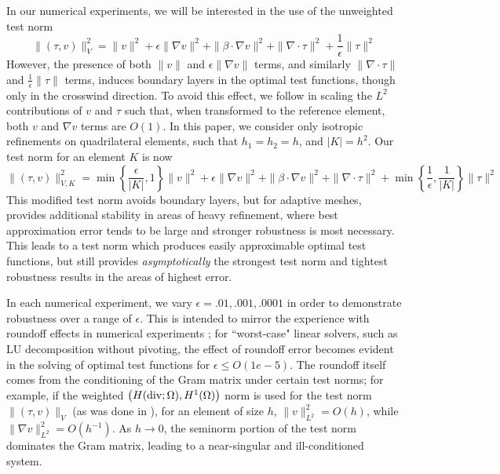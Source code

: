 \documentclass[11pt,onecolumn]{scrartcl}
\newcommand{\grad}{\nabla}
\renewcommand{\div}{\grad \cdot}
\begin{document}
In our numerical experiments, we will be interested in the use of the unweighted test norm 
\[
\|\left(\tau, v\right)\|_{V}^2 = \|v\|^2 + \epsilon \|\grad v\|^2 + \|\beta \cdot \grad v\|^2 + \| \div \tau\|^2 + \frac{1}{\epsilon}\|\tau\|^2
\]
However, the presence of both $\|v\|$ and $\epsilon\|\grad v\|$ terms, and similarly $\|\div \tau\|$ and $\frac{1}{\epsilon}\|\tau\|$ terms, induces boundary layers in the optimal test functions, though only in the crosswind direction.  To avoid this effect, we follow \cite{DPGrobustness} in scaling the $L^2$ contributions of $v$ and $\tau$ such that, when transformed to the reference element, both $v$ and $\grad v$ terms are $O(1)$.  In this paper, we consider only isotropic refinements on quadrilateral elements, such that $h_1 = h_2 = h$, and $|K| = h^2$. Our test norm for an element $K$ is now
\[
\|\left(\tau, v\right)\|_{V,K}^2 = \min\left\{\frac{\epsilon}{|K|},1\right\}\|v\|^2 + \epsilon \|\grad v\|^2 + \|\beta \cdot \grad v\|^2 + \| \div \tau\|^2 + \min\left\{\frac{1}{\epsilon},\frac{1}{|K|}\right\}\|\tau\|^2
\]
This modified test norm avoids boundary layers, but for adaptive meshes, provides additional stability in areas of heavy refinement, where best approximation error tends to be large and stronger robustness is most necessary.  This leads to a test norm which produces easily approximable optimal test functions, but still provides \textit{asymptotically} the strongest test norm and tightest robustness results in the areas of highest error.  



In each numerical experiment, we vary $\epsilon = .01, .001, .0001$ in order to demonstrate robustness over a range of $\epsilon$.  This is intended to mirror the experience with roundoff effects in numerical experiments \cite{DPGrobustness}; for ``worst-case" linear solvers, such as LU decomposition without pivoting, the effect of roundoff error becomes evident in the solving of optimal test functions for $\epsilon \leq O(1e-5)$.  The roundoff itself comes from the conditioning of the Gram matrix under certain test norms; for example, if the weighted $\left(H({\rm div};\Omega), H^1(\Omega)\right)$ norm is used for the test norm $\|\left(\tau,v\right)\|_V$ (as was done in \cite{DPG2}), for an element of size $h$, $\|v\|_{L^2}^2 = O(h)$, while $\|\grad v\|_{L^2}^2 = O(h^{-1})$. As $h\rightarrow 0$, the seminorm portion of the test norm dominates the Gram matrix, leading to a near-singular and ill-conditioned system. 
\end{document}
